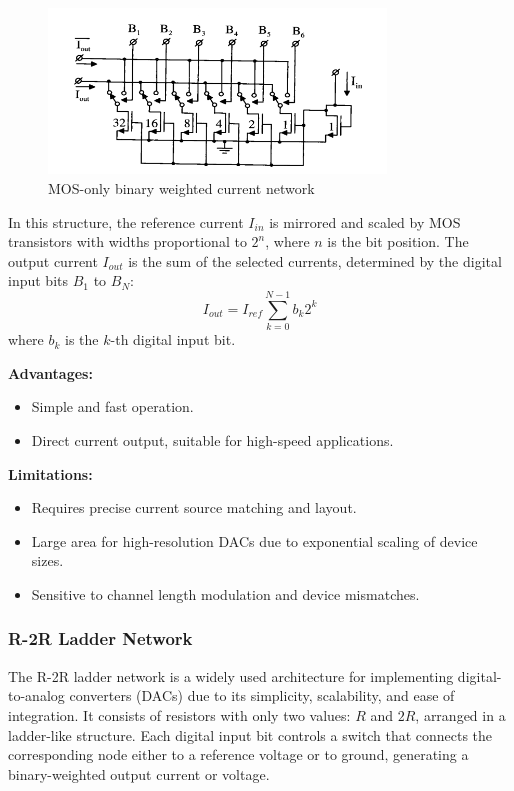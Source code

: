 \begin{figure}[h]
    \centering
    \includegraphics[width=0.8\textwidth]{figs/binary_weighted_current_source.png}
    \caption{MOS-only binary weighted current network}
    \label{fig:binary_weighted_current_source}
\end{figure}

In this structure, the reference current $I_{in}$ is mirrored and scaled by MOS transistors with widths proportional to $2^n$, where $n$ is the bit position. The output current $I_{out}$ is the sum of the selected currents, determined by the digital input bits $B_1$ to $B_N$:
\begin{equation}
    I_{out} = I_{ref} \sum_{k=0}^{N-1} b_k 2^k
\end{equation}
where $b_k$ is the $k$-th digital input bit.

\textbf{Advantages:}
\begin{itemize}
    \item Simple and fast operation.
    \item Direct current output, suitable for high-speed applications.
\end{itemize}

\textbf{Limitations:}
\begin{itemize}
    \item Requires precise current source matching and layout.
    \item Large area for high-resolution DACs due to exponential scaling of device sizes.
    \item Sensitive to channel length modulation and device mismatches.
\end{itemize}

\subsubsection{R-2R Ladder Network}
    The R-2R ladder network is a widely used architecture for implementing digital-to-analog converters (DACs) due to its simplicity, scalability, and ease of integration. It consists of resistors with only two values: $R$ and $2R$, arranged in a ladder-like structure. Each digital input bit controls a switch that connects the corresponding node either to a reference voltage or to ground, generating a binary-weighted output current or voltage.

